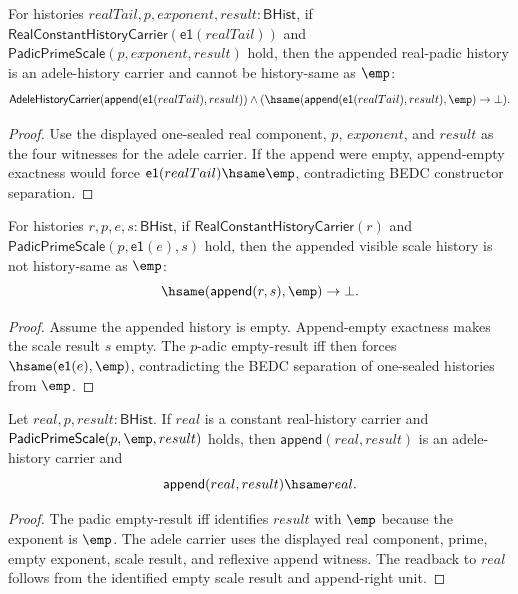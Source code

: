 \begin{theorem}
\label{thm:adele-history-carrier-e1-real-append-nonempty}
For histories $realTail,p,exponent,result:\mathsf{BHist}$, if
$\mathsf{RealConstantHistoryCarrier}(\mathsf{e1}(realTail))$ and
$\mathsf{PadicPrimeScale}(p,exponent,result)$ hold, then the appended real-padic
history is an adele-history carrier and cannot be history-same as $\emp$:
$$
\mathsf{AdeleHistoryCarrier}(\mathsf{append}(\mathsf{e1}(realTail),result))\land
(\hsame(\mathsf{append}(\mathsf{e1}(realTail),result),\emp)\to\bot).
$$
\end{theorem}
\begin{proof}
Use the displayed one-sealed real component, $p$, $exponent$, and $result$ as
the four witnesses for the adele carrier. If the append were empty, append-empty
exactness would force $\mathsf{e1}(realTail)\hsame\emp$, contradicting BEDC
constructor separation.
\end{proof}

\begin{theorem}
\label{thm:adele-visible-scale-append-not-empty}
For histories $r,p,e,s:\mathsf{BHist}$, if
$\mathsf{RealConstantHistoryCarrier}(r)$ and
$\mathsf{PadicPrimeScale}(p,\mathsf{e1}(e),s)$ hold, then the appended visible
scale history is not history-same as $\emp$:
$$
\hsame(\mathsf{append}(r,s),\emp)\to\bot.
$$
\end{theorem}
\begin{proof}
Assume the appended history is empty. Append-empty exactness makes the scale
result $s$ empty. The $p$-adic empty-result iff then forces
$\hsame(\mathsf{e1}(e),\emp)$, contradicting the BEDC separation of one-sealed
histories from $\emp$.
\end{proof}

\begin{theorem}
\label{thm:adele-history-carrier-empty-scale-real-readback}
Let $real,p,result:\mathsf{BHist}$. If $real$ is a constant real-history
carrier and $\mathsf{PadicPrimeScale}(p,\emp,result)$ holds, then
$\mathsf{append}(real,result)$ is an adele-history carrier and
$$
\mathsf{append}(real,result)\hsame real.
$$
\end{theorem}
\begin{proof}
The padic empty-result iff identifies $result$ with $\emp$ because the
exponent is $\emp$. The adele carrier uses the displayed real component, prime,
empty exponent, scale result, and reflexive append witness. The readback to
$real$ follows from the identified empty scale result and append-right unit.
\end{proof}

